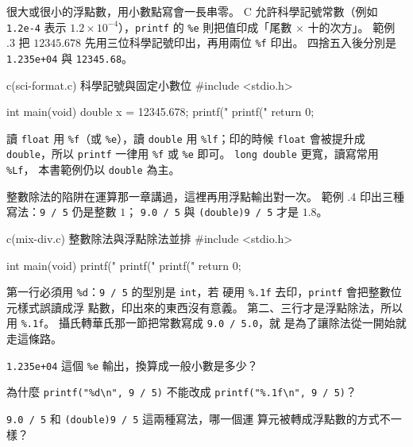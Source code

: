 很大或很小的浮點數，用小數點寫會一長串零。 C 允許科學記號常數（例如
\texttt{1.2e-4} 表示 $1.2 \times 10^{-4}$），\texttt{printf} 的
\texttt{\%e} 則把值印成「尾數 $\times$ 十的次方」。 範例
\thechapter.3 把 $12345.678$ 先用三位科學記號印出，再用兩位
\texttt{\%f} 印出。 四捨五入後分別是 \texttt{1.235e+04} 與
\texttt{12345.68}。

\begin{example}{c}{(sci-format.c) 科學記號與固定小數位}
#include <stdio.h>

int main(void) {
    double x = 12345.678;
    printf("%
    printf("%
    return 0;
}
\end{example}


讀 \texttt{float} 用 \texttt{\%f}（或 \texttt{\%e}），讀
\texttt{double} 用 \texttt{\%lf}；印的時候 \texttt{float} 會被提升成
\texttt{double}，所以 \texttt{printf} 一律用 \texttt{\%f} 或
\texttt{\%e} 即可。 \texttt{long double} 更寬，讀寫常用 \texttt{\%Lf}，
本書範例仍以 \texttt{double} 為主。

整數除法的陷阱在運算那一章講過，這裡再用浮點輸出對一次。 範例
\thechapter.4 印出三種寫法：\texttt{9 / 5} 仍是整數 $1$；
\texttt{9.0 / 5} 與 \texttt{(double)9 / 5} 才是 $1.8$。

\begin{example}{c}{(mix-div.c) 整數除法與浮點除法並排}
#include <stdio.h>

int main(void) {
    printf("%
    printf("%
    printf("%
    return 0;
}
\end{example}


第一行必須用 \texttt{\%d}：\texttt{9 / 5} 的型別是 \texttt{int}，若
硬用 \texttt{\%.1f} 去印，\texttt{printf} 會把整數位元樣式誤讀成浮
點數，印出來的東西沒有意義。 第二、三行才是浮點除法，所以用
\texttt{\%.1f}。 攝氏轉華氏那一節把常數寫成 \texttt{9.0 / 5.0}，就
是為了讓除法從一開始就走這條路。

\begin{drills}[label=drills:float-sci-notation]
\item \texttt{1.235e+04} 這個 \texttt{\%e} 輸出，換算成一般小數是多少？
\item 為什麼 \texttt{printf("\%d\textbackslash n", 9 / 5)} 不能改成
\texttt{printf("\%.1f\textbackslash n", 9 / 5)}？
\item \texttt{9.0 / 5} 和 \texttt{(double)9 / 5} 這兩種寫法，哪一個運
算元被轉成浮點數的方式不一樣？
\end{drills}

